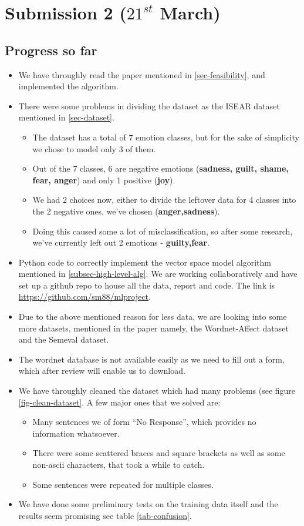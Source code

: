 \chapter{Submission 2 ($21^{st}$ March)}
\section{Progress so far}
\begin{itemize}
 \item We have throughly read the paper mentioned in \ref{sec-feasibility}, and implemented the algorithm.
 \item There were some problems in dividing the dataset as the ISEAR dataset mentioned in \ref{sec-dataset}.
 \begin{itemize}
  \item The dataset has a total of 7 emotion classes, but for the sake of simplicity we chose to model only 3 of them.
  \item Out of the 7 classes, 6 are negative emotions (\textbf{sadness, guilt, shame, fear, anger}) and only 1 positive (\textbf{joy}).
  \item We had 2 choices now, either to divide the leftover data for 4 classes into the 2 negative ones, we've chosen (\textbf{anger,sadness}).
  \item Doing this caused some a lot of misclassification, so after some research, we've currently left out 2 emotions - \textbf{guilty,fear}.
 \end{itemize}
 \item Python code to correctly implement the vector space model algorithm mentioned in \ref{subsec-high-level-alg}. We are working collaboratively and have set up a github repo to house all the data, report and code. The link is \url{https://github.com/sm88/mlproject}.
 \item Due to the above mentioned reason for less data, we are looking into some more datasets, mentioned in the paper namely, the Wordnet-Affect dataset and the Semeval dataset.
 \item The wordnet database is not available easily as we need to fill out a form, which after review will enable us to download.
 \item We have throughly cleaned the dataset which had many problems (see figure \ref{fig-clean-dataset}. A few major ones that we solved are:
 \begin{itemize}
  \item Many sentences we of form ``No Response'', which provides no information whatsoever.
  \item There were some scattered braces and square brackets as well as some non-ascii characters, that took a while to catch.
  \item Some sentences were repeated for multiple classes.
 \end{itemize}
 \item We have done some preliminary tests on the training data itself and the results seem promising see table \ref{tab-confusion}.
\end{itemize}
